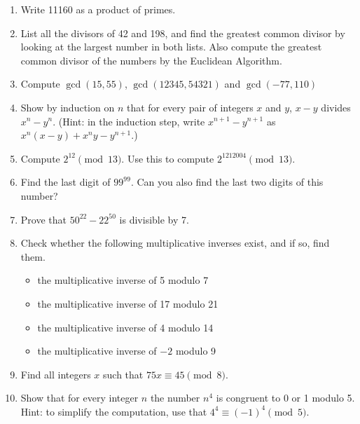 \documentclass[letterpaper,10pt,english]{sphinxmanual}
\begin{document}
\begin{enumerate}
\item {} 
\sphinxAtStartPar
Write 11160 as a product of primes.

\item {} 
\sphinxAtStartPar
List all the divisors of 42 and 198, and find the greatest common divisor by looking at the largest number in both lists. Also compute the greatest common divisor of the numbers by the Euclidean Algorithm.

\item {} 
\sphinxAtStartPar
Compute \(\gcd(15, 55)\), \(\gcd(12345, 54321)\) and \(\gcd(-77, 110)\)

\item {} 
\sphinxAtStartPar
Show by induction on \(n\) that for every pair of integers \(x\) and \(y\), \(x - y\) divides \(x^n - y^n\). (Hint: in the induction step, write \(x^{n+1} - y^{n+1}\) as \(x^n (x - y) + x^n y - y^{n+1}\).)

\item {} 
\sphinxAtStartPar
Compute \(2^{12} \pmod{13}\). Use this to compute \(2^{1212004} \pmod{13}\).

\item {} 
\sphinxAtStartPar
Find the last digit of \(99^{99}\). Can you also find the last two digits of this number?

\item {} 
\sphinxAtStartPar
Prove that \(50^{22} - 22^{50}\) is divisible by 7.

\item {} 
\sphinxAtStartPar
Check whether the following multiplicative inverses exist, and if so, find them.
\begin{itemize}
\item {} 
\sphinxAtStartPar
the multiplicative inverse of 5 modulo 7

\item {} 
\sphinxAtStartPar
the multiplicative inverse of 17 modulo 21

\item {} 
\sphinxAtStartPar
the multiplicative inverse of 4 modulo 14

\item {} 
\sphinxAtStartPar
the multiplicative inverse of \(-2\) modulo 9

\end{itemize}

\item {} 
\sphinxAtStartPar
Find all integers \(x\) such that \(75x \equiv 45 \pmod{8}\).

\item {} 
\sphinxAtStartPar
Show that for every integer \(n\) the number \(n^4\) is congruent to 0 or 1 modulo 5. Hint: to simplify the computation, use that \(4^4\equiv(-1)^4\pmod{5}\).


\end{enumerate}
\end{document}
